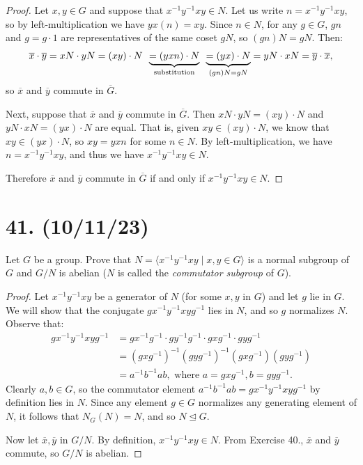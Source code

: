 \documentclass{article}
\begin{document}
\begin{proof}
    Let $x, y \in G$ and suppose that $x^{-1}y^{-1}xy \in N$. Let us write $n = x^{-1}y^{-1}xy$, so by left-multiplication we have $yx(n) = xy$. Since $n \in N$, for any $g \in G$, $gn$ and $g = g \cdot 1$ are representatives of the same coset $gN$, so $(gn)N = gN$. Then:
    \begin{align*}
        \overline{x} \cdot \overline{y} = xN \cdot yN = (xy) \cdot N \hspace{0.5em} \underbrace{= (yxn) \cdot N}_{\text{substitution}} \hspace{0.5em} \underbrace{= (yx) \cdot N}_{(gn)N = gN} = yN \cdot xN = \overline{y} \cdot \overline{x},
    \end{align*}
    so $\overline{x}$ and $\overline{y}$ commute in $\overline{G}$.

    Next, suppose that $\overline{x}$ and $\overline{y}$ commute in $\overline{G}$. Then $xN \cdot yN = (xy) \cdot N$ and $yN \cdot xN = (yx) \cdot N$ are equal. That is, given $xy \in (xy) \cdot N$, we know that $xy \in (yx) \cdot N$, so $xy = yxn$ for some $n \in N$. By left-multiplication, we have $n = x^{-1}y^{-1}xy$, and thus we have $x^{-1}y^{-1}xy \in N$.

    Therefore $\overline{x}$ and $\overline{y}$ commute in $\overline{G}$ if and only if $x^{-1}y^{-1}xy \in N$.
\end{proof}

\section*{41. (10/11/23)}

Let $G$ be a group. Prove that $N = \langle x^{-1}y^{-1}xy \mid x, y \in G \rangle$ is a normal subgroup of $G$ and $G/N$ is abelian ($N$ is called the \emph{commutator subgroup} of $G$).

\begin{proof}
    Let $x^{-1}y^{-1}xy$ be a generator of $N$ (for some $x, y$ in $G$) and let $g$ lie in $G$. We will show that the conjugate $gx^{-1}y^{-1}xyg^{-1}$ lies in $N$, and so $g$ normalizes $N$. Observe that:
    \begin{align*}
        gx^{-1}y^{-1}xyg^{-1} &= gx^{-1}g^{-1} \cdot gy^{-1}g^{-1} \cdot gxg^{-1} \cdot gyg^{-1} \\
        &= (gxg^{-1})^{-1}(gyg^{-1})^{-1}(gxg^{-1})(gyg^{-1}) \\
        &= a^{-1}b^{-1}ab, \text{ where } a = gxg^{-1}, b = gyg^{-1}.
    \end{align*}
    Clearly $a, b \in G$, so the commutator element $a^{-1}b^{-1}ab = gx^{-1}y^{-1}xyg^{-1}$ by definition lies in $N$. Since any element $g \in G$ normalizes any generating element of $N$, it follows that $N_G(N) = N$, and so $N \unlhd G$.

    Now let $\overline{x}, \overline{y}$ in $G/N$. By definition, $x^{-1}y^{-1}xy \in N$. From Exercise 40., $\overline{x}$ and $\overline{y}$ commute, so $G/N$ is abelian.
\end{proof}
\end{document}
